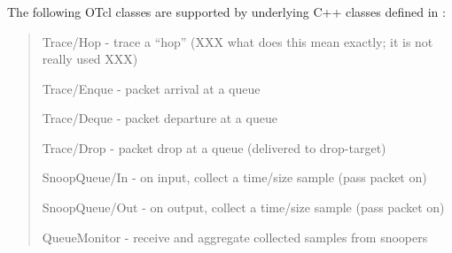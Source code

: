 \subsubsection{}
The following OTcl classes are supported by underlying C++
classes defined in :
\begin{itemize}
\begin{quote}
	\item [Trace/Hop] - trace a ``hop'' (XXX what does this mean exactly; it is not really used XXX)
	\item [Trace/Enque] - packet arrival at a queue
	\item [Trace/Deque] - packet departure at a queue
	\item [Trace/Drop] - packet drop at a queue (delivered to drop-target)
	\item [SnoopQueue/In] - on input, collect a time/size sample (pass packet on)
	\item [SnoopQueue/Out] - on output, collect a time/size sample (pass packet on)
	\item [QueueMonitor] - receive and aggregate collected samples from snoopers
\end{quote}
\end{itemize}

